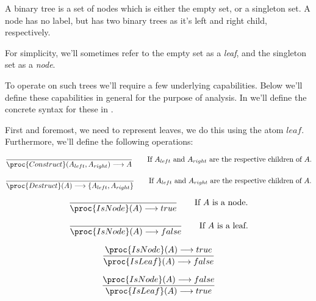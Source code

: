 \begin{definition}

A binary tree is a set of nodes which is either the empty set, or a singleton
set. A node has no label, but has two binary trees as it's left and right
child, respectively.

\end{definition}

For simplicity, we'll sometimes refer to the empty set as a \emph{leaf}, and
the singleton set as a \emph{node}.

To operate on such trees we'll require a few underlying capabilities. Below
we'll define these capabilities in general for the purpose of analysis. In
 we'll define the concrete syntax for these in
.

First and foremost, we need to represent leaves, we do this using the atom
$leaf$. Furthermore, we'll define the following operations:

\begin{equation}
{
{}\over{
\proc{Construct}(A_{left}, A_{right})
\longrightarrow
A
}}
\ \ \ \ \ \ \text{If $A_{left}$ and $A_{right}$ are the respective children
of $A$.}
\end{equation}

\begin{equation}
{
{}\over{
\proc{Destruct}(A)
\longrightarrow
\{A_{left},A_{right}\}
}}
\ \ \ \ \ \ \text{If $A_{left}$ and $A_{right}$ are the respective children
of $A$.}
\end{equation}

\begin{equation}
{
{}\over{
\proc{IsNode}(A)
\longrightarrow
true
}}
\ \ \ \ \ \ \text{If $A$ is a node.}
\end{equation}

\begin{equation}
{
{}\over{
\proc{IsNode}(A)
\longrightarrow
false
}}
\ \ \ \ \ \ \text{If $A$ is a leaf.}
\end{equation}

\begin{equation}
{
{
\proc{IsNode}(A)
\longrightarrow
true
}\over{
\proc{IsLeaf}(A)
\longrightarrow
false
}}
\end{equation}

\begin{equation}
{
{
\proc{IsNode}(A)
\longrightarrow
false
}\over{
\proc{IsLeaf}(A)
\longrightarrow
true
}}
\end{equation}

